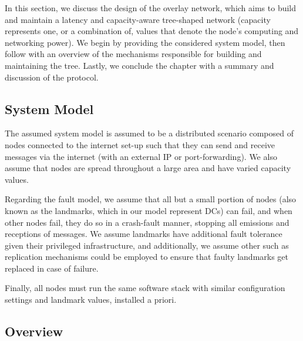


In this section, we discuss the design of the overlay network, which aims to build and maintain a latency and capacity-aware tree-shaped network (capacity represents one, or a combination of, values that denote the node's computing and networking power). We begin by providing the considered system model, then follow with an overview of the mechanisms responsible for building and maintaining the tree. Lastly, we conclude the chapter with a summary and discussion of the protocol.

\subsection{System Model}

The assumed system model is assumed to be a distributed scenario composed of nodes connected to the internet set-up such that they can send and receive messages via the internet (with an external IP or port-forwarding). We also assume that nodes are spread throughout a large area and have varied capacity values.

Regarding the fault model, we assume that all but a small portion of nodes (also known as the landmarks, which in our model represent DCs) can fail, and when other nodes fail, they do so in a crash-fault manner, stopping all emissions and receptions of messages. We assume landmarks have additional fault tolerance given their privileged infrastructure, and additionally, we assume other such as replication \cite{} mechanisms could be employed to ensure that faulty landmarks get replaced in case of failure. 
  
Finally, all nodes must run the same software stack with similar configuration settings and landmark values, installed a priori.

\subsection{Overview}

